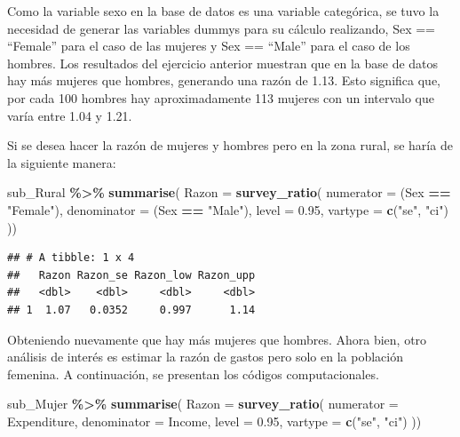 \documentclass[
  spanish,
  12pt,
]{book}
\newenvironment{Shaded}{\begin{snugshade}}{\end{snugshade}}
\newcommand{\AttributeTok}[1]{\textcolor[rgb]{0.13,0.29,0.53}{#1}}
\newcommand{\FloatTok}[1]{\textcolor[rgb]{0.00,0.00,0.81}{#1}}
\newcommand{\FunctionTok}[1]{\textcolor[rgb]{0.13,0.29,0.53}{\textbf{#1}}}
\newcommand{\NormalTok}[1]{#1}
\newcommand{\SpecialCharTok}[1]{\textcolor[rgb]{0.81,0.36,0.00}{\textbf{#1}}}
\newcommand{\StringTok}[1]{\textcolor[rgb]{0.31,0.60,0.02}{#1}}
\begin{document}
Como la variable sexo en la base de datos es una variable categórica, se tuvo la necesidad de generar las variables dummys para su cálculo realizando, Sex == ``Female'' para el caso de las mujeres y Sex == ``Male'' para el caso de los hombres. Los resultados del ejercicio anterior muestran que en la base de datos hay más mujeres que hombres, generando una razón de 1.13. Esto significa que, por cada 100 hombres hay aproximadamente 113 mujeres con un intervalo que varía entre 1.04 y 1.21.

Si se desea hacer la razón de mujeres y hombres pero en la zona rural, se haría de la siguiente manera:

\begin{Shaded}
\begin{Highlighting}[]
\NormalTok{sub\_Rural }\SpecialCharTok{\%\textgreater{}\%} \FunctionTok{summarise}\NormalTok{(}
    \AttributeTok{Razon =}  \FunctionTok{survey\_ratio}\NormalTok{(}
      \AttributeTok{numerator =}\NormalTok{ (Sex }\SpecialCharTok{==} \StringTok{"Female"}\NormalTok{),}
      \AttributeTok{denominator =}\NormalTok{ (Sex }\SpecialCharTok{==} \StringTok{"Male"}\NormalTok{),}
      \AttributeTok{level =} \FloatTok{0.95}\NormalTok{,}
    \AttributeTok{vartype =}  \FunctionTok{c}\NormalTok{(}\StringTok{"se"}\NormalTok{, }\StringTok{"ci"}\NormalTok{)}
\NormalTok{    ))}
\end{Highlighting}
\end{Shaded}

\begin{verbatim}
## # A tibble: 1 x 4
##   Razon Razon_se Razon_low Razon_upp
##   <dbl>    <dbl>     <dbl>     <dbl>
## 1  1.07   0.0352     0.997      1.14
\end{verbatim}

Obteniendo nuevamente que hay más mujeres que hombres. Ahora bien, otro análisis de interés es estimar la razón de gastos pero solo en la población femenina. A continuación, se presentan los códigos computacionales.

\begin{Shaded}
\begin{Highlighting}[]
\NormalTok{sub\_Mujer }\SpecialCharTok{\%\textgreater{}\%} \FunctionTok{summarise}\NormalTok{(}
    \AttributeTok{Razon =}  \FunctionTok{survey\_ratio}\NormalTok{(}
      \AttributeTok{numerator =}\NormalTok{ Expenditure,}
      \AttributeTok{denominator =}\NormalTok{ Income,}
      \AttributeTok{level =} \FloatTok{0.95}\NormalTok{,}
    \AttributeTok{vartype =}  \FunctionTok{c}\NormalTok{(}\StringTok{"se"}\NormalTok{, }\StringTok{"ci"}\NormalTok{)}
\NormalTok{    ))}
\end{Highlighting}
\end{Shaded}
\end{document}
